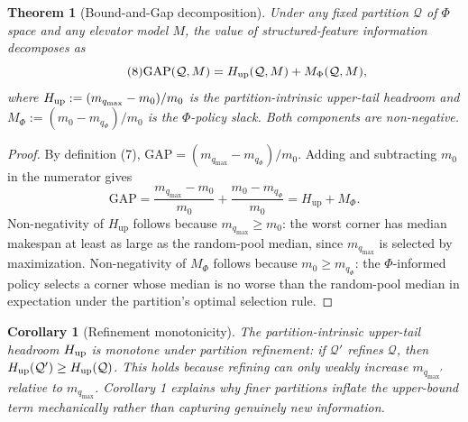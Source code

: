 \documentclass[11pt, a4paper]{article}
\newtheorem{theorem}{Theorem}
\newtheorem{corollary}{Corollary}
\theoremstyle{definition}
\begin{document}
\begin{theorem}[Bound-and-Gap decomposition]\label{thm:bg}
Under any fixed partition $\mathcal{Q}$ of $\Phi$ space and any elevator model $M$, the value of structured-feature information decomposes as
\begin{equation}\label{eq:bg-decomp}\tag{8}
\textnormal{GAP}(\mathcal{Q}, M) = H_{\textnormal{up}}(\mathcal{Q}, M) + M_\Phi(\mathcal{Q}, M),
\end{equation}
where $H_{\textnormal{up}} := (m_{q_{\max}} - m_0) / m_0$ is the \emph{partition-intrinsic upper-tail headroom} and $M_\Phi := (m_0 - m_{q_\Phi}) / m_0$ is the \emph{$\Phi$-policy slack}. Both components are non-negative.
\end{theorem}

\begin{proof}
By definition (7), $\text{GAP} = (m_{q_{\max}} - m_{q_\Phi}) / m_0$. Adding and subtracting $m_0$ in the numerator gives
\begin{equation*}
\text{GAP} = \frac{m_{q_{\max}} - m_0}{m_0} + \frac{m_0 - m_{q_\Phi}}{m_0} = H_{\text{up}} + M_\Phi.
\end{equation*}
Non-negativity of $H_{\text{up}}$ follows because $m_{q_{\max}} \geq m_0$: the worst corner has median makespan at least as large as the random-pool median, since $m_{q_{\max}}$ is selected by maximization. Non-negativity of $M_\Phi$ follows because $m_0 \geq m_{q_\Phi}$: the $\Phi$-informed policy selects a corner whose median is no worse than the random-pool median in expectation under the partition's optimal selection rule.
\end{proof}

\begin{corollary}[Refinement monotonicity]\label{cor:refinement}
The partition-intrinsic upper-tail headroom $H_{\textnormal{up}}$ is monotone under partition refinement: if $\mathcal{Q}'$ refines $\mathcal{Q}$, then $H_{\textnormal{up}}(\mathcal{Q}') \geq H_{\textnormal{up}}(\mathcal{Q})$. This holds because refining can only weakly increase $m_{q_{\max}'}$ relative to $m_{q_{\max}}$. Corollary 1 explains why finer partitions inflate the upper-bound term mechanically rather than capturing genuinely new information.
\end{corollary}
\end{document}
